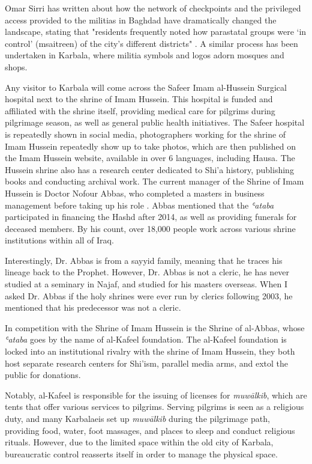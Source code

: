 Omar Sirri has written about how the network of checkpoints and the privileged access provided to the militias in Baghdad have dramatically changed the landscape, stating that "residents frequently noted how parastatal groups were ‘in control’ (msaitreen) of the city’s different districts" \cite[14]{omar_sirri_destructive_2021}. A similar process has been undertaken in Karbala, where militia symbols and logos adorn mosques and shops. 

Any visitor to Karbala will come across the Safeer Imam al-Hussein Surgical hospital next to the shrine of Imam Hussein. This hospital is funded and affiliated with the shrine itself, providing medical care for pilgrims during pilgrimage season, as well as general public health initiatives. The Safeer hospital is repeatedly shown in social media, photographers working for the shrine of Imam Hussein repeatedly show up to take photos, which are then published on the Imam Hussein website, available in over 6 languages, including Hausa. The Hussein shrine also has a research center dedicated to Shi'a history, publishing books and conducting archival work. The current manager of the Shrine of Imam Hussein is Doctor Nofour Abbas, who completed a masters in business management before taking up his role \cite{nofour_abbas_interview_2021}. Abbas mentioned that the \emph{ʿataba} participated in financing the Hashd after 2014, as well as providing funerals for deceased members. By his count, over 18,000 people work across various shrine institutions within all of Iraq. 

Interestingly, Dr. Abbas is from a sayyid family, meaning that he traces his lineage back to the Prophet. However, Dr. Abbas is not a cleric, he has never studied at a seminary in Najaf, and studied for his masters overseas. When I asked Dr. Abbas if the holy shrines were ever run by clerics following 2003, he mentioned that his predecessor was not a cleric. 

In competition with the Shrine of Imam Hussein is the Shrine of al-Abbas, whose \emph{ʿataba} goes by the name of al-Kafeel foundation. The al-Kafeel foundation is locked into an institutional rivalry with the shrine of Imam Hussein, they both host separate research centers for Shi'ism, parallel media arms, and extol the public for donations. 

Notably, al-Kafeel is responsible for the issuing of licenses for \emph{muwālkib}, which are tents that offer various services to pilgrims. Serving pilgrims is seen as a religious duty, and many Karbalaeis set up \emph{muwālkib} during the pilgrimage path, providing food, water, foot massages, and places to sleep and conduct religious rituals. However, due to the limited space within the old city of Karbala, bureaucratic control reasserts itself in order to manage the physical space. 

